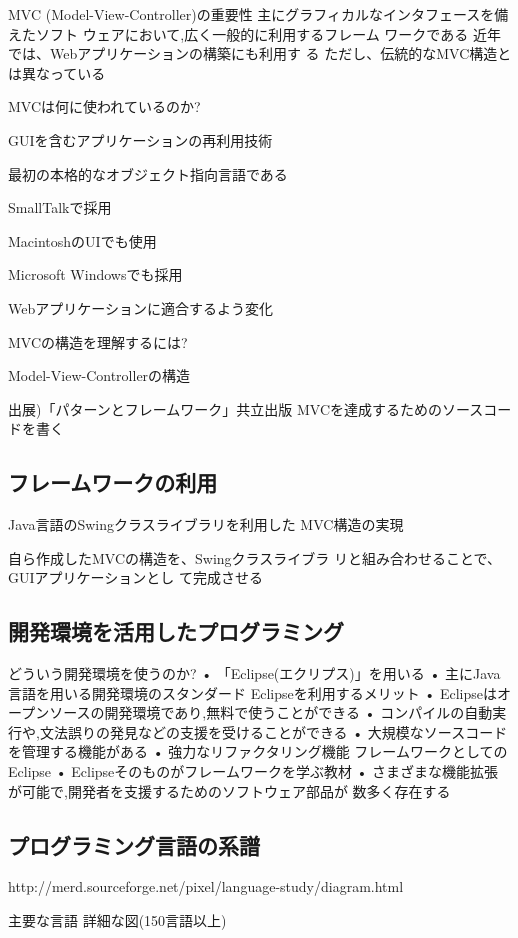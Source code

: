\documentclass[a4j,papersize]{jsbook}
\begin{document}
MVC (Model-View-Controller)の重要性
 主にグラフィカルなインタフェースを備えたソフト
ウェアにおいて,広く一般的に利用するフレーム
ワークである
 近年では、Webアプリケーションの構築にも利用す
る
 ただし、伝統的なMVC構造とは異なっている

MVCは何に使われているのか?

GUIを含むアプリケーションの再利用技術

最初の本格的なオブジェクト指向言語である

SmallTalkで採用

MacintoshのUIでも使用

Microsoft Windowsでも採用

Webアプリケーションに適合するよう変化

MVCの構造を理解するには?

Model-View-Controllerの構造

出展)「パターンとフレームワーク」共立出版
MVCを達成するためのソースコードを書く

\subsection{フレームワークの利用}
Java言語のSwingクラスライブラリを利用した
MVC構造の実現

自ら作成したMVCの構造を、Swingクラスライブラ
リと組み合わせることで、GUIアプリケーションとし
て完成させる

\subsection{開発環境を活用したプログラミング}
どういう開発環境を使うのか?
• 「Eclipse(エクリプス)」を用いる
• 主にJava言語を用いる開発環境のスタンダード
Eclipseを利用するメリット
• Eclipseはオープンソースの開発環境であり,無料で使うことができる
• コンパイルの自動実行や,文法誤りの発見などの支援を受けることができる
• 大規模なソースコードを管理する機能がある
• 強力なリファクタリング機能
フレームワークとしてのEclipse
• Eclipseそのものがフレームワークを学ぶ教材
• さまざまな機能拡張が可能で,開発者を支援するためのソフトウェア部品が
数多く存在する

\subsection{プログラミング言語の系譜}

http://merd.sourceforge.net/pixel/language-study/diagram.html

 主要な言語
 詳細な図(150言語以上)
\end{document}
